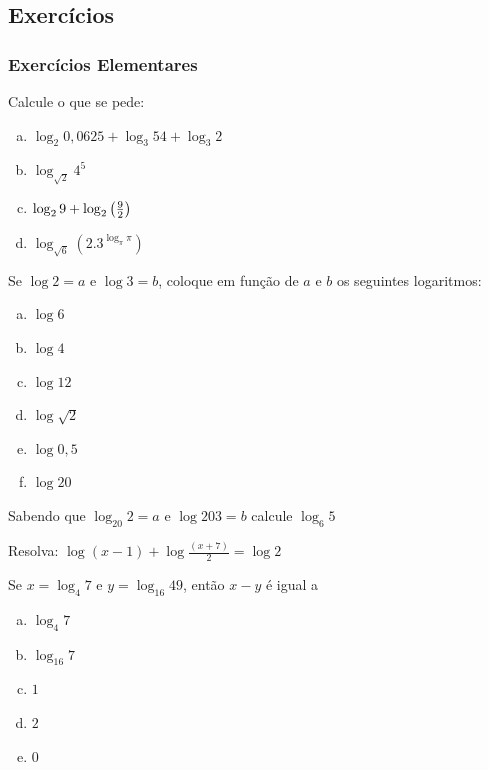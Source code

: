 \subsection*{Exercícios}
\subsubsection{Exercícios Elementares}

\begin{exer} Calcule o que se pede:
\begin{enumerate}[a)]
\item $\log_2{0,0625} + \log_3{54}+\log_3{2}$
\item $\log_{\sqrt{2}}{4^5}$
\item $\log_2{9}+\log_2{\left ( \frac{9}{2} \right)}$
\item $\log_{\sqrt{6}}{(2.3^{\log_{\pi}{\pi}})}$
\end{enumerate}
\end{exer}

\begin{exer} Se $\log2=a$ e $\log3=b$, coloque em função de $a$ e $b$ os seguintes logaritmos:
\begin{enumerate}[a)]
\item $\log6$
\item $\log4$
\item $\log12$
\item $\log{\sqrt{2}}$
\item $\log0,5$
\item $\log20$
\end{enumerate}
\end{exer}

\begin{exer} Sabendo que $\log_{20}2=a$ e $\log{20}3=b$ calcule $\log_6{5}$
\end{exer}
\begin{exer}Resolva: $\log(x-1) + \log{\frac{(x+7)}{2}}=\log2$
\end{exer}
\begin{exer}[FUVEST] Se $x = \log_4{7}$ e $y=\log_{16}{49}$, então $x-y$ é igual a 
\begin{enumerate}[a)]
\item $\log_4{7}$
\item $\log_{16}{7}$
\item $1$
\item $2$
\item $0$
\end{enumerate}
\end{exer}

